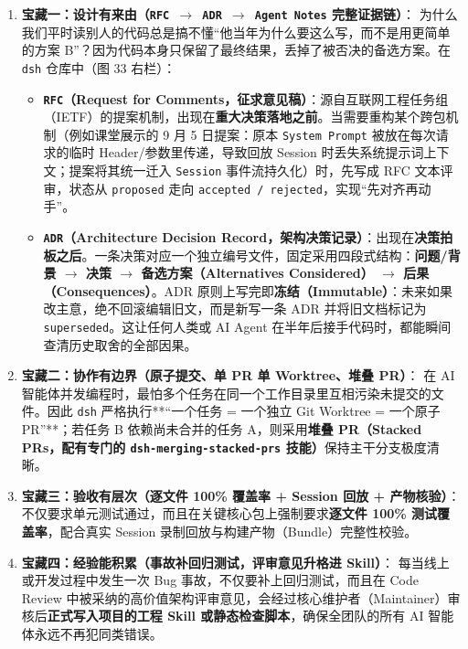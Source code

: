 \documentclass[a4paper]{article}
\begin{document}
\begin{enumerate}
    \item \textbf{宝藏一：设计有来由（\texttt{RFC $\to$ ADR $\to$ Agent Notes} 完整证据链）}：
    为什么我们平时读别人的代码总是搞不懂“他当年为什么要这么写，而不是用更简单的方案 B”？因为代码本身只保留了最终结果，丢掉了被否决的备选方案。在 \texttt{dsh} 仓库中（图 33 右栏）：
    \begin{itemize}
        \item \textbf{\texttt{RFC}（Request for Comments，征求意见稿）}：源自互联网工程任务组（IETF）的提案机制，出现在\textbf{重大决策落地之前}。当需要重构某个跨包机制（例如课堂展示的 9 月 5 日提案：原本 \texttt{System Prompt} 被放在每次请求的临时 Header/参数里传递，导致回放 Session 时丢失系统提示词上下文；提案将其统一迁入 \texttt{Session} 事件流持久化）时，先写成 RFC 文本评审，状态从 \texttt{proposed} 走向 \texttt{accepted / rejected}，实现“先对齐再动手”。
        \item \textbf{\texttt{ADR}（Architecture Decision Record，架构决策记录）}：出现在\textbf{决策拍板之后}。一条决策对应一个独立编号文件，固定采用四段式结构：\textbf{问题/背景 $\to$ 决策 $\to$ 备选方案（Alternatives Considered） $\to$ 后果（Consequences）}。ADR 原则上写完即\textbf{冻结（Immutable）}：未来如果改主意，绝不回滚编辑旧文，而是新写一条 ADR 并将旧文档标记为 \texttt{superseded}。这让任何人类或 AI Agent 在半年后接手代码时，都能瞬间查清历史取舍的全部因果。
    \end{itemize}
    \item \textbf{宝藏二：协作有边界（原子提交、单 PR 单 Worktree、堆叠 PR）}：
    在 AI 智能体并发编程时，最怕多个任务在同一个工作目录里互相污染未提交的文件。因此 \texttt{dsh} 严格执行**“一个任务 = 一个独立 Git Worktree = 一个原子 PR”**；若任务 B 依赖尚未合并的任务 A，则采用\textbf{堆叠 PR（Stacked PRs，配有专门的 \texttt{dsh-merging-stacked-prs} 技能）}保持主干分支极度清晰。
    \item \textbf{宝藏三：验收有层次（逐文件 100\% 覆盖率 + Session 回放 + 产物核验）}：
    不仅要求单元测试通过，而且在关键核心包上强制要求\textbf{逐文件 100\% 测试覆盖率}，配合真实 Session 录制回放与构建产物（Bundle）完整性校验。
    \item \textbf{宝藏四：经验能积累（事故补回归测试，评审意见升格进 Skill）}：
    每当线上或开发过程中发生一次 Bug 事故，不仅要补上回归测试，而且在 Code Review 中被采纳的高价值架构评审意见，会经过核心维护者（Maintainer）审核后\textbf{正式写入项目的工程 Skill 或静态检查脚本}，确保全团队的所有 AI 智能体永远不再犯同类错误。
\end{enumerate}
\end{document}
